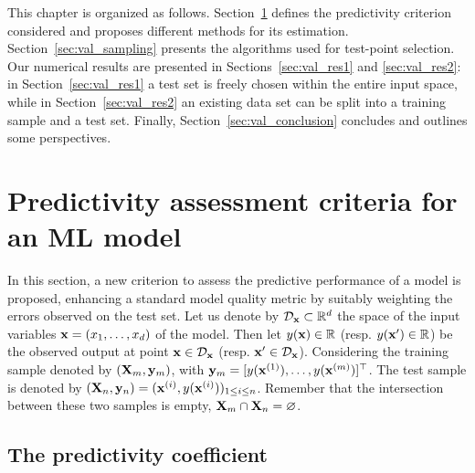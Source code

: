 This chapter is organized as follows. 
Section~\ref{sec:q2} defines the predictivity criterion considered and proposes different methods for its estimation. 
Section~\ref{sec:val_sampling} presents the algorithms used for test-point selection. 
Our numerical results are presented in Sections~\ref{sec:val_res1} and \ref{sec:val_res2}: in Section~\ref{sec:val_res1} a test set is freely chosen within the entire input space, while in Section~\ref{sec:val_res2} an existing data set can be split into a training sample and a test set. 
Finally, Section~\ref{sec:val_conclusion} concludes and outlines some perspectives.




\section{Predictivity assessment criteria for an ML model}\label{sec:q2}
In this section, a new criterion to assess the predictive performance of a model is proposed, enhancing a standard model quality metric by suitably weighting the errors observed on the test set. 
Let us denote by $\mathcal{D}_{\bf x} \subset \mathbb{R}^d$ the space of the input variables ${\bf x}=(x_1,\ldots,x_d)$ of the model. 
Then let $y({\bf x}) \in \mathbb{R}$ (resp. $y({\bf x}') \in \mathbb{R}$) be the observed output at point ${\bf x} \in \mathcal{D}_{\bf x}$ (resp. ${\bf x}' \in \mathcal{D}_{\bf x}$). 
Considering the training sample denoted by $({\bf X}_m,{\bf y}_m)$, with ${\bf y}_m = [y({\bf x}^{(1)}),\ldots,y({\bf x}^{(m)})]^\top$. 
The test sample is denoted by $({\bf X}_n,{\bf y}_n) = ({\bf x}^{(i)},y({\bf x}^{(i)}))_{1\leq i \leq n}$. 
Remember that the intersection between these two samples is empty, ${\bf X}_m \cap {\bf X}_n = \varnothing$.


\subsection{The predictivity coefficient}

